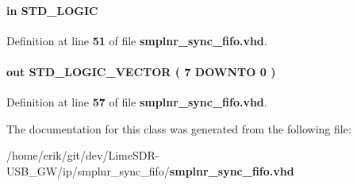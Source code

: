 \paragraph[{wrreq}]{ {\bfseries \textcolor{keywordflow}{in}\textcolor{vhdlchar}{ }} {\bfseries \textcolor{comment}{S\+T\+D\+\_\+\+L\+O\+G\+IC}\textcolor{vhdlchar}{ }} \hspace{0.3cm}{\ttfamily [Port]}}\label{classsmplnr__sync__fifo_ae7e02414aa516307988efa17ff21d58c}


Definition at line {\bf 51} of file {\bf smplnr\+\_\+sync\+\_\+fifo.\+vhd}.

\paragraph[{wrusedw}]{ {\bfseries \textcolor{keywordflow}{out}\textcolor{vhdlchar}{ }} {\bfseries \textcolor{comment}{S\+T\+D\+\_\+\+L\+O\+G\+I\+C\+\_\+\+V\+E\+C\+T\+OR}\textcolor{vhdlchar}{ }\textcolor{vhdlchar}{(}\textcolor{vhdlchar}{ }\textcolor{vhdlchar}{ } \textcolor{vhdldigit}{7} \textcolor{vhdlchar}{ }\textcolor{keywordflow}{D\+O\+W\+N\+TO}\textcolor{vhdlchar}{ }\textcolor{vhdlchar}{ } \textcolor{vhdldigit}{0} \textcolor{vhdlchar}{ }\textcolor{vhdlchar}{)}\textcolor{vhdlchar}{ }} \hspace{0.3cm}{\ttfamily [Port]}}\label{classsmplnr__sync__fifo_a0922210f5049617f771a3d25d46e6fc3}


Definition at line {\bf 57} of file {\bf smplnr\+\_\+sync\+\_\+fifo.\+vhd}.



The documentation for this class was generated from the following file\+:\begin{DoxyCompactItemize}
\item 
/home/erik/git/dev/\+Lime\+S\+D\+R-\/\+U\+S\+B\+\_\+\+G\+W/ip/smplnr\+\_\+sync\+\_\+fifo/{\bf smplnr\+\_\+sync\+\_\+fifo.\+vhd}\end{DoxyCompactItemize}
